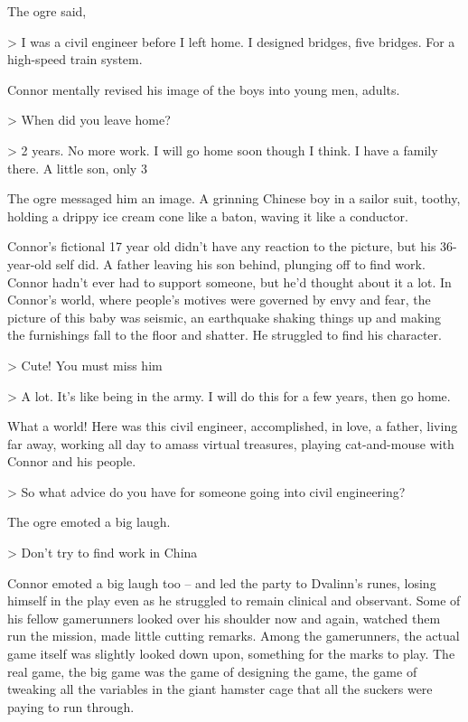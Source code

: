 The ogre said,

\textgreater{} I was a civil engineer before I left home. I
designed bridges, five bridges. For a high-speed train system.

Connor mentally revised his image of the boys into young men,
adults.

\textgreater{} When did you leave home?

\textgreater{} 2 years. No more work. I will go home soon though I
think. I have a family there. A little son, only 3

The ogre messaged him an image. A grinning Chinese boy in a sailor
suit, toothy, holding a drippy ice cream cone like a baton, waving
it like a conductor.

Connor's fictional 17 year old didn't have any reaction to the
picture, but his 36-year-old self did. A father leaving his son
behind, plunging off to find work. Connor hadn't ever had to
support someone, but he'd thought about it a lot. In Connor's
world, where people's motives were governed by envy and fear, the
picture of this baby was seismic, an earthquake shaking things up
and making the furnishings fall to the floor and shatter. He
struggled to find his character.

\textgreater{} Cute! You must miss him

\textgreater{} A lot. It's like being in the army. I will do this
for a few years, then go home.

What a world! Here was this civil engineer, accomplished, in love,
a father, living far away, working all day to amass virtual
treasures, playing cat-and-mouse with Connor and his people.

\textgreater{} So what advice do you have for someone going into
civil engineering?

The ogre emoted a big laugh.

\textgreater{} Don't try to find work in China

Connor emoted a big laugh too -- and led the party to Dvalinn's
runes, losing himself in the play even as he struggled to remain
clinical and observant. Some of his fellow gamerunners looked over
his shoulder now and again, watched them run the mission, made
little cutting remarks. Among the gamerunners, the actual game
itself was slightly looked down upon, something for the marks to
play. The real game, the big game was the game of designing the
game, the game of tweaking all the variables in the giant hamster
cage that all the suckers were paying to run through.

